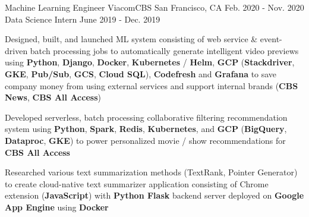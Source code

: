 \begin{cventries}
\cventryupdate
    {Machine Learning Engineer} %
    {ViacomCBS} %
    {San Francisco, CA} %
    {Feb. 2020 - Nov. 2020} %
    {Data Science Intern} %
    {June 2019 - Dec. 2019} %
    {
      \begin{cvitems} %
        \item {Designed, built, and launched ML system consisting of web service \& event-driven batch processing jobs to automatically generate intelligent video previews using \textbf{Python}, \textbf{Django}, \textbf{Docker}, \textbf{Kubernetes} / \textbf{Helm}, \textbf{GCP} (\textbf{Stackdriver}, \textbf{GKE}, \textbf{Pub/Sub}, \textbf{GCS}, \textbf{Cloud SQL}), \textbf{Codefresh} and \textbf{Grafana} to save company money from using external services and support internal brands (\textbf{CBS News}, \textbf{CBS All Access})}
 		\item {Developed serverless, batch processing collaborative filtering recommendation system using \textbf{Python}, \textbf{Spark}, \textbf{Redis}, \textbf{Kubernetes}, and \textbf{GCP} (\textbf{BigQuery}, \textbf{Dataproc}, \textbf{GKE}) to power personalized movie / show recommendations for \textbf{CBS All Access}}
  		\item {Researched various text summarization methods (TextRank, Pointer Generator) to create cloud-native text summarizer application consisting of Chrome extension (\textbf{JavaScript}) with \textbf{Python Flask} backend server deployed on \textbf{Google App Engine} using \textbf{Docker}}

\end{cvitems}}
\end{cventries}
